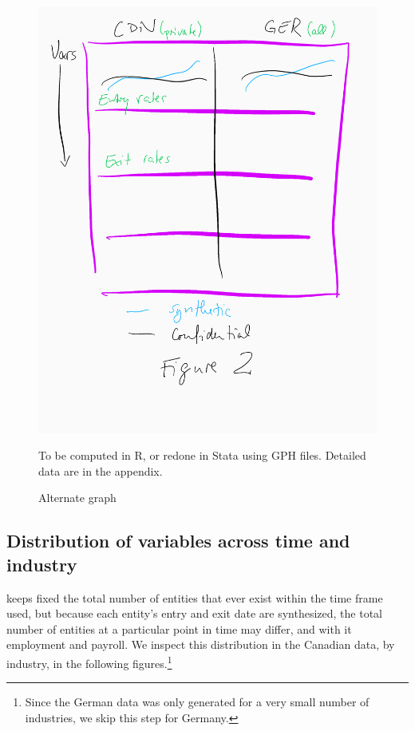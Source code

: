 \begin{figure} [H]
\centering
\label{tab:Can:FirmDynamics}
\includegraphics[width=.8\linewidth]{graphs/Figure2-placeholder.png} 
\caption{Alternate graph} 
\begin{minipage}{0.48\linewidth}
{\footnotesize To be computed in R, or redone in Stata using GPH files. Detailed data are in the appendix. \par}
\end{minipage}
\end{figure}


\subsection{Distribution of variables across time and industry}

\SynLBD{} keeps fixed the total number of entities that ever exist within the time frame used, but because each entity's entry and exit date are synthesized, the total number of entities at a particular point in time may differ, and with it employment and payroll. We inspect this distribution in the Canadian data, by industry, in the following figures.\footnote{Since the German data was only generated for a very small number of industries, we skip this step for Germany.} 


